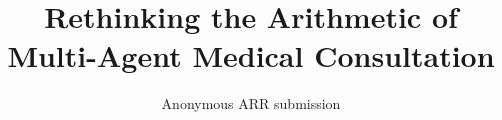 \documentclass[11pt]{article}
\title{Rethinking the Arithmetic of Multi-Agent Medical Consultation}
\author{Anonymous ARR submission}
\begin{document}
\maketitle

\begin{abstract}

\end{abstract}




\appendix

\end{document}
